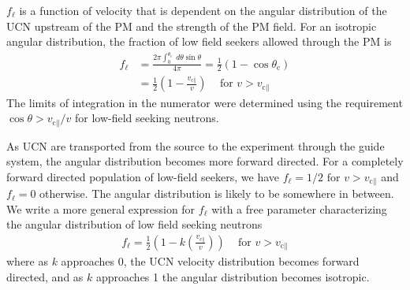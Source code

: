 $f_\ell$ is a function of velocity that is dependent on the angular distribution of the UCN upstream of the PM and the strength of the PM field. For an isotropic angular distribution, the fraction of low field seekers allowed through the PM is
%
\begin{align}\label{eq:fL_isotropic}
    f_\ell &= \frac{2\pi \int^{\theta_\text{c}}_{0}\: d\theta \sin\theta}{4\pi} = \frac{1}{2}\left(1 - \cos\theta_\text{c}\right) \\
    &= \frac{1}{2}\left( 1 - \frac{v_{\text{c}\parallel}}{v} \right) \hspace{10pt} \text{ for } v>v_{\text{c}\parallel}
\end{align}
%
The limits of integration in the numerator were determined using the requirement $\cos\theta > v_{\text{c}\parallel} / v$ for low-field seeking neutrons.

As UCN are transported from the source to the experiment through the guide system, the angular distribution becomes more forward directed. For a completely forward directed population of low-field seekers, we have $f_\ell = 1/2 \text{ for } v>v_{\text{c}\parallel}$ and $f_\ell = 0$ otherwise. The angular distribution is likely to be somewhere in between. We write a more general expression for $f_\ell$ with a free parameter characterizing the angular distribution of low field seeking neutrons
%
\begin{gather}
    f_\ell=\frac{1}{2} \left( 1 - k\left(\frac{v_{\text{c}\parallel}}{v}\right) \right)  \hspace{10pt
    } \text{ for } v>v_{\text{c}\parallel}\label{eq:fL_k}
\end{gather}
%
where as $k$ approaches 0, the UCN velocity distribution becomes forward directed, and as $k$ approaches 1 the angular distribution becomes isotropic.

